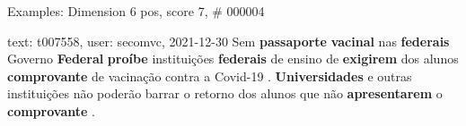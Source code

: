 \begin{frame}{Examples: Dimension 6 pos, score 7, \# 000004}
\footnotesize
\begin{exampleblock}{text: t007558, user: secomvc, 2021-12-30}
 Sem \textbf{passaporte} \textbf{vacinal} nas \textbf{federais} 
 Governo \textbf{Federal} \textbf{proíbe} instituições 
\textbf{federais} de ensino de \textbf{exigirem} dos alunos 
\textbf{comprovante} de vacinação contra a Covid-19 . \textbf{Universidades} e 
outras instituições não poderão barrar o retorno dos alunos que não 
\textbf{apresentarem} o \textbf{comprovante} . 
\end{exampleblock}
\end{frame}
